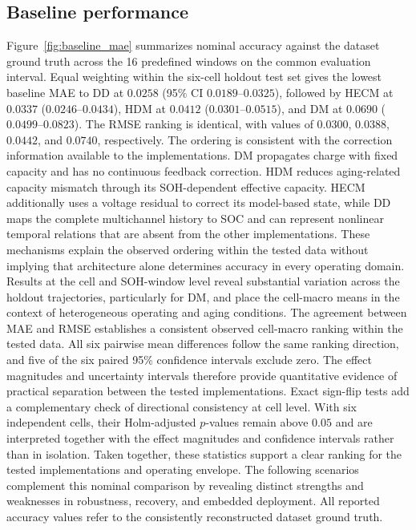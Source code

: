 \documentclass[review,nopreprintline]{elsarticle}
\begin{document}
\subsection{Baseline performance}
Figure~\ref{fig:baseline_mae} summarizes nominal accuracy against the dataset ground truth across the 16 predefined windows on the common evaluation interval. Equal weighting within the six-cell holdout test set gives the lowest baseline MAE to DD at $0.0258$ (95\% CI $0.0189$--$0.0325$), followed by HECM at $0.0337$ ($0.0246$--$0.0434$), HDM at $0.0412$ ($0.0301$--$0.0515$), and DM at $0.0690$ ($0.0499$--$0.0823$). The RMSE ranking is identical, with values of $0.0300$, $0.0388$, $0.0442$, and $0.0740$, respectively. The ordering is consistent with the correction information available to the implementations. DM propagates charge with fixed capacity and has no continuous feedback correction. HDM reduces aging-related capacity mismatch through its SOH-dependent effective capacity. HECM additionally uses a voltage residual to correct its model-based state, while DD maps the complete multichannel history to SOC and can represent nonlinear temporal relations that are absent from the other implementations. These mechanisms explain the observed ordering within the tested data without implying that architecture alone determines accuracy in every operating domain. Results at the cell and SOH-window level reveal substantial variation across the holdout trajectories, particularly for DM, and place the cell-macro means in the context of heterogeneous operating and aging conditions. The agreement between MAE and RMSE establishes a consistent observed cell-macro ranking within the tested data. All six pairwise mean differences follow the same ranking direction, and five of the six paired 95\% confidence intervals exclude zero. The effect magnitudes and uncertainty intervals therefore provide quantitative evidence of practical separation between the tested implementations. Exact sign-flip tests add a complementary check of directional consistency at cell level. With six independent cells, their Holm-adjusted $p$-values remain above $0.05$ and are interpreted together with the effect magnitudes and confidence intervals rather than in isolation. Taken together, these statistics support a clear ranking for the tested implementations and operating envelope. The following scenarios complement this nominal comparison by revealing distinct strengths and weaknesses in robustness, recovery, and embedded deployment. All reported accuracy values refer to the consistently reconstructed dataset ground truth.
\end{document}
